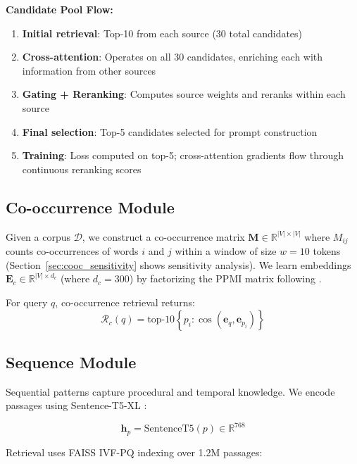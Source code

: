 \documentclass[10pt,twocolumn]{article}
\begin{document}
\textbf{Candidate Pool Flow:}
\begin{enumerate}
    \item \textbf{Initial retrieval}: Top-10 from each source (30 total candidates)
    \item \textbf{Cross-attention}: Operates on all 30 candidates, enriching each with information from other sources
    \item \textbf{Gating + Reranking}: Computes source weights and reranks within each source
    \item \textbf{Final selection}: Top-5 candidates selected for prompt construction
    \item \textbf{Training}: Loss computed on top-5; cross-attention gradients flow through continuous reranking scores
\end{enumerate}


\subsection{Co-occurrence Module}

Given a corpus $\mathcal{D}$, we construct a co-occurrence matrix $\mathbf{M} \in \mathbb{R}^{|V| \times |V|}$ where $M_{ij}$ counts co-occurrences of words $i$ and $j$ within a window of size $w=10$ tokens (Section~\ref{sec:cooc_sensitivity} shows sensitivity analysis). We learn embeddings $\mathbf{E}_c \in \mathbb{R}^{|V| \times d_c}$ (where $d_c=300$) by factorizing the PPMI matrix following \cite{pennington2014glove}.

For query $q$, co-occurrence retrieval returns:
\begin{equation}
\mathcal{R}_c(q) = \text{top-}10 \left\{ p_i : \cos(\mathbf{e}_q, \mathbf{e}_{p_i}) \right\}
\end{equation}


\subsection{Sequence Module}

Sequential patterns capture procedural and temporal knowledge. We encode passages using Sentence-T5-XL \cite{ni2022sentence_t5}:

\begin{equation}
\mathbf{h}_p = \text{SentenceT5}(p) \in \mathbb{R}^{768}
\end{equation}

Retrieval uses FAISS IVF-PQ indexing \cite{johnson2019faiss} over 1.2M passages:
\end{document}
